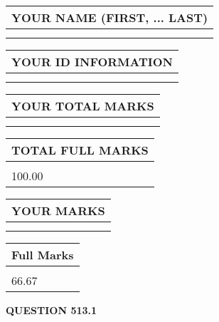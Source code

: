 \documentclass{ctexart}
\begin{document}
   
   
   
\newpage 
\setcounter{page}{ 
   513001 } 
   
   
   
   
\noindent\begin{tabular}{|l|}
\hline
YOUR NAME (FIRST, ... LAST)  \\
\hline
 \\ 
 \\ 
\hline
\end{tabular}
\hspace{0.05in} \begin{tabular}{|l|}
\hline
 YOUR   ID   INFORMATION  \\
\hline
 \\ 
 \\ 
\hline
\end{tabular}
   
   
\vspace{0.2in}\noindent\begin{tabular}{|l|}
\hline
YOUR TOTAL MARKS  \\
\hline
 \\ 
 \\ 
\hline
\end{tabular}
\hspace{0.05in} \begin{tabular}{|l|}
\hline
TOTAL FULL MARKS  \\
\hline
 \\ 
100.00 \\
\hline
\end{tabular}
   
   
 \vspace{0.2in}
 
 
 
 
   
   
  
\vspace{0.2in}
  
\noindent\begin{tabular}{|l|}
\hline
 YOUR MARKS  \\
\hline
 \\ 
 \\ 
\hline
\end{tabular}
\hspace{0.05in} \begin{tabular}{|l|}
\hline
 Full Marks  \\
\hline
 \\ 
66.67 \\
\hline
\end{tabular}
{\textbf{\Large{QUESTION
513.1 
}}}
  
\end{document}
